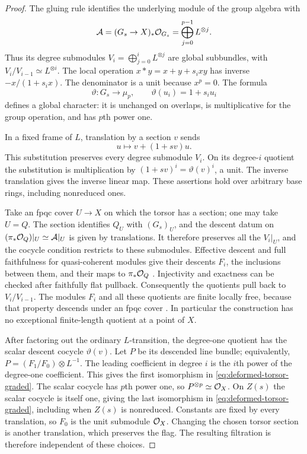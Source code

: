 \begin{proof}
The gluing rule identifies the underlying module of the group algebra
with
\[
 \mathcal A=(G_s\to X)_*\mathcal O_{G_s}
 =\bigoplus_{j=0}^{p-1}L^{\otimes j}.
\]
Thus its degree submodules
$V_i=\bigoplus_{j=0}^iL^{\otimes j}$ are global subbundles, with
$V_i/V_{i-1}\simeq L^{\otimes i}$.
The local operation $x*y=x+y+s_i xy$ has inverse
$-x/(1+s_i x)$. The denominator is a unit because $x^p=0$.
The formula
\[
 \vartheta:G_s\longrightarrow\mu_p,\qquad
 \vartheta(u_i)=1+s_i u_i
\]
defines a global character: it is unchanged on overlaps,
is multiplicative for the group operation, and has $p$th power one.

In a fixed frame of $L$, translation by a section $v$ sends
\[
 u\longmapsto v+(1+sv)u.
\]
This substitution preserves every degree submodule $V_i$.
On its degree-$i$ quotient the substitution is multiplication by
$(1+sv)^i=\vartheta(v)^i$, a unit. The inverse translation gives
the inverse linear map. These assertions hold over arbitrary
base rings, including nonreduced ones.

Take an fpqc cover $U\to X$ on which the torsor has a section;
one may take $U=Q$. The section identifies $Q_U$ with $(G_s)_U$,
and the descent datum on
$(\pi_*\mathcal O_Q)|_U\simeq\mathcal A|_U$ is given by translations.
It therefore preserves all the $V_i|_U$, and the cocycle condition
restricts to these submodules. Effective descent and full faithfulness
for quasi-coherent modules give their descents $F_i$, the inclusions
between them, and their maps to $\pi_*\mathcal O_Q$
\cite[Proposition~35.5.2, Tag~023T]{Stacks}.
Injectivity and exactness can be checked after faithfully flat pullback.
Consequently the quotients pull back to $V_i/V_{i-1}$.
The modules $F_i$ and all these quotients are finite locally free,
because that property descends under an fpqc cover
\cite[Lemma~35.7.6, Tag~05B2]{Stacks}.
In particular the construction has no exceptional finite-length
quotient at a point of $X$.

After factoring out the ordinary $L$-transition, the degree-one
quotient has the scalar descent cocycle $\vartheta(v)$.
Let $P$ be its descended line bundle; equivalently,
$P=(F_1/F_0)\otimes L^{-1}$.
The leading coefficient in degree $i$ is the $i$th power of the
degree-one coefficient. This gives the first isomorphism in
\eqref{eq:deformed-torsor-graded}. The scalar cocycle has $p$th
power one, so $P^{\otimes p}\simeq\mathcal O_X$.
On $Z(s)$ the scalar cocycle is itself one, giving the last
isomorphism in \eqref{eq:deformed-torsor-graded}, including when
$Z(s)$ is nonreduced. Constants are fixed by every translation,
so $F_0$ is the unit submodule $\mathcal O_X$.
Changing the chosen torsor section is another translation,
which preserves the flag. The resulting filtration is therefore
independent of these choices.
\end{proof}

